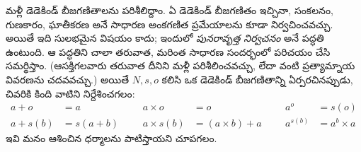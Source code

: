 \documentclass[../../../include/open-logic-section]{subfiles}
\begin{document}
మళ్లీ డెడెకిండ్ బీజగణితాలను పరిశీలిద్దాం. ఏ డెడెకిండ్ బీజగణితం ఇచ్చినా,
సంకలనం, గుణకారం, ఘాతీకరణ అనే సాధారణ అంకగణిత ప్రమేయాలను కూడా
నిర్వచించవచ్చు. అయితే ఇది సులభమైన విషయం కాదు; ఇందులో
\emph{పునరావృత్త నిర్వచనం} అనే పద్ధతి ఉంటుంది. ఆ పద్ధతిని చాలా
తరువాత, మరింత సాధారణ సందర్భంలో పరిచయం చేసి సమర్థిస్తాం.
(ఆసక్తిగలవారు  తరువాత దీనిని
మళ్లీ పరిశీలించవచ్చు, లేదా \citealt[pp.~95--8]{Potter2004} వంటి
ప్రత్యామ్నాయ వివరణను చదవవచ్చు.) అయితే $N, s, o$ కలిసి ఒక డెడెకిండ్
బీజగణితాన్ని ఏర్పరచినప్పుడు, చివరికి కింది వాటిని నిర్దేశించగలం:
\begin{align*}
	{a} + {o} &= {a} & & & {a} \times {o} &= {o} & & & {a}^{o} &= s(o)\\
	{a} + {s}({b}) &= {s}({a}+{b}) &&& {a} \times {s}({b}) &= ({a}\times {b}) + {a}  & & & {a}^{{s}({b})} &= {a}^{b} \times {a}
\end{align*}
ఇవి మనం ఆశించిన ధర్మాలను పాటిస్తాయని చూపగలం.
\end{document}
